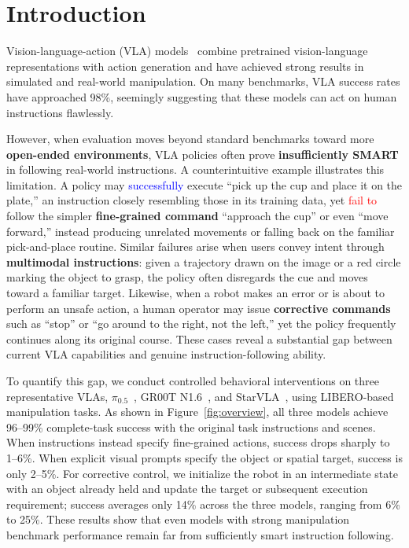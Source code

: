 \section{Introduction}\label{introduction}

Vision-language-action (VLA)
models~\citep{yu2026dm0,liu2026g05,xiaomi2026robotics1,zhang2026hyvla05,ma2026internvla15,wu2026lingbotvla2,jiang2026robottt,generalist2026gen1,generalist2026gen15,genesis2026gene265}
combine pretrained vision-language representations with action generation and have achieved strong
results in simulated and real-world manipulation. On many benchmarks, VLA success rates have
approached 98\%, seemingly suggesting that these models can act on human instructions flawlessly.


However, when evaluation moves beyond standard benchmarks toward more \textbf{open-ended
environments}, VLA policies often prove \textbf{insufficiently SMART} in following real-world
instructions. A counterintuitive example illustrates this limitation. A policy may
\textcolor{blue}{successfully} execute ``pick up the cup and place it on the plate,'' an instruction
closely resembling those in its training data, yet \textcolor{red}{fail to} follow the simpler
\textbf{fine-grained command} ``approach the cup'' or even ``move forward,'' instead producing
unrelated movements or falling back on the familiar pick-and-place routine. Similar failures arise
when users convey intent through \textbf{multimodal instructions}: given a trajectory drawn on the
image or a red circle marking the object to grasp, the policy often disregards the cue and moves
toward a familiar target. Likewise, when a robot makes an error or is about to perform an unsafe
action, a human operator may issue \textbf{corrective commands} such as ``stop'' or ``go around to
the right, not the left,'' yet the policy frequently continues along its original course. These
cases reveal a substantial gap between current VLA capabilities and genuine instruction-following
ability.



To quantify this gap, we conduct controlled behavioral interventions on three representative VLAs,
$\pi_{0.5}$~\citep{intelligence2025pi}, GR00T N1.6~\citep{gear2025gr00tn16}, and
StarVLA~\citep{community2026starvla}, using LIBERO-based manipulation tasks. As shown in
Figure~\ref{fig:overview}, all three models achieve 96--99\% complete-task success with the
original task instructions and scenes. When instructions instead specify fine-grained actions,
success drops sharply to 1--6\%. When explicit visual prompts specify the object or spatial target,
success is only 2--5\%. For corrective control, we initialize the robot in an intermediate state
with an object already held and update the target or subsequent execution requirement; success
averages only 14\% across the three models, ranging from 6\% to 25\%. These results show that even
models with strong manipulation benchmark performance remain far from sufficiently smart instruction
following.

